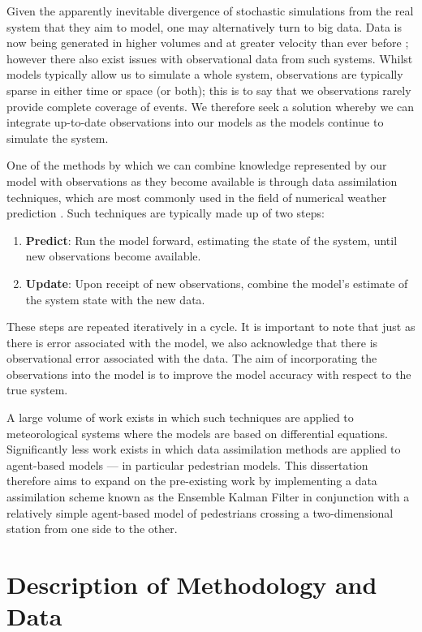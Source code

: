 \documentclass[12pt, twoside, a4paper]{article}
\begin{document}
Given the apparently inevitable divergence of stochastic simulations from the
real system that they aim to model, one may alternatively turn to big data.
Data is now being generated in higher volumes and at greater velocity than ever
before \citep{chen2014big}; however there also exist issues with observational
data from such systems.
Whilst models typically allow us to simulate a whole system, observations are
typically sparse in either time or space (or both); this is to say that we
observations rarely provide complete coverage of events.
We therefore seek a solution whereby we can integrate up-to-date observations
into our models as the models continue to simulate the system.

One of the methods by which we can combine knowledge represented by our model
with observations as they become available is through data assimilation
techniques, which are most commonly used in the field of numerical weather
prediction \citep{kalnay2003atmospheric}.
Such techniques are typically made up of two steps:
\begin{enumerate}
    \item \textbf{Predict}: Run the model forward, estimating the state of the
        system, until new observations become available.
    \item \textbf{Update}: Upon receipt of new observations, combine the model's
        estimate of the system state with the new data.
\end{enumerate}
These steps are repeated iteratively in a cycle.
It is important to note that just as there is error associated with the model,
we also acknowledge that there is observational error associated with the data.
The aim of incorporating the observations into the model is to improve the model
accuracy with respect to the true system.

A large volume of work exists in which such techniques are applied to
meteorological systems where the models are based on differential equations.
Significantly less work exists in which data assimilation methods are applied to
agent-based models --- in particular pedestrian models.
This dissertation therefore aims to expand on the pre-existing work by
implementing a data assimilation scheme known as the Ensemble Kalman Filter in
conjunction with a relatively simple agent-based model of pedestrians crossing a
two-dimensional station from one side to the other.

\section{Description of Methodology and Data}\label{sec:method_descr}
\end{document}
